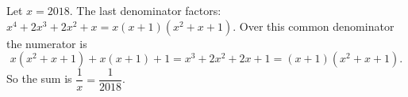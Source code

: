 Let $x=2018$. The last denominator factors: $x^4+2x^3+2x^2+x=x(x+1)(x^2+x+1)$. Over this common denominator the numerator is
\[x(x^2+x+1)+x(x+1)+1=x^3+2x^2+2x+1=(x+1)(x^2+x+1).\]
So the sum is $\dfrac1x=\boxed{\dfrac1{2018}}$.
